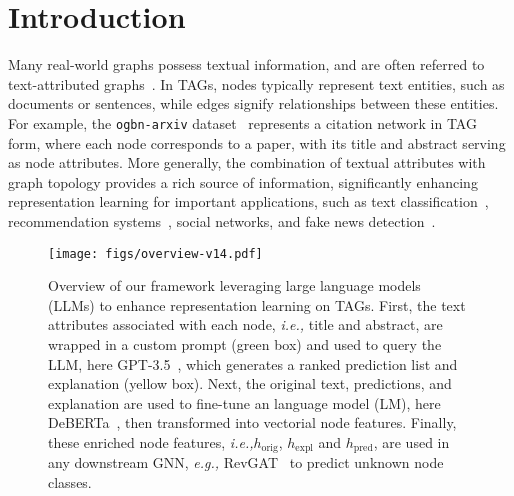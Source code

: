 \documentclass{article}
\newcommand{\ie}{\emph{i.e.,}\xspace}
\newcommand{\eg}{\emph{e.g.,}\xspace}
\begin{document}
\section{Introduction}
Many real-world graphs possess textual information, and are often referred to text-attributed graphs~\citep{yang2021graphformers}. In TAGs, nodes typically represent text entities, such as documents or sentences, while edges signify relationships between these entities. For example, the \texttt{ogbn-arxiv} dataset~\citep{hu2020open} represents a citation network in TAG form, where each node corresponds to a paper, with its title and abstract serving as node attributes. More generally, the combination of textual attributes with graph topology provides a rich source of information,  significantly enhancing representation learning for important applications, such as text classification~\citep{yang2015network_TADW, wang2016linked, yasunaga2017graph, chien2021node_giant, zhao2022learning_em}, recommendation systems~\citep{zhu2021textgnn}, social networks, and fake news detection~\citep{liu2019fine_fact_verify}.


\begin{figure}[t]
\vspace{-0.6cm}
    \centering
    \texttt{[image: figs/overview-v14.pdf]}
    \caption{Overview of our framework leveraging large language models (LLMs) to enhance representation learning on TAGs. First, the text attributes associated with each node, \ie title and abstract, are wrapped in a custom prompt (green box) and used to query the LLM, here GPT-3.5~\citep{brown2020language_gpt}, which generates a ranked prediction list and explanation (yellow box). Next, the original text, predictions, and explanation are used to fine-tune an language model (LM), here DeBERTa~\citep{he2021deberta}, then transformed into vectorial node features. Finally, these enriched node features, \ie $h_\textrm{orig}$, $h_\textrm{expl}$ and $h_\textrm{pred}$, are used in any downstream GNN, \eg RevGAT~\citep{li2021training_revgat} to predict unknown node classes.}
\label{fig: overview}
    \vspace{-0.4cm}
\end{figure}
\end{document}
